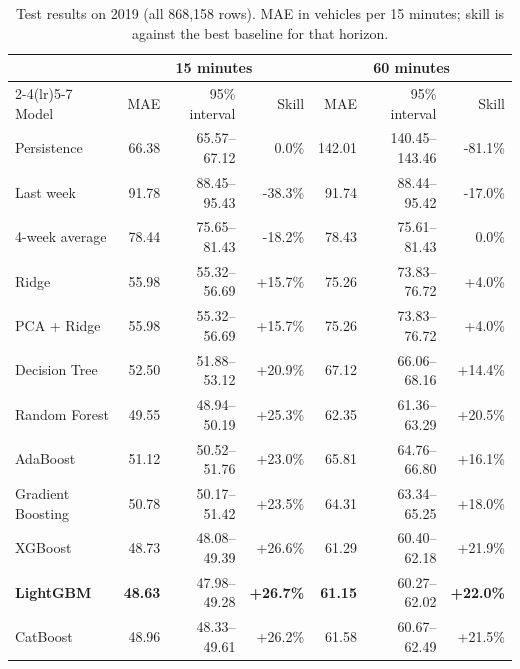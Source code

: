 ﻿\documentclass[11pt,a4paper]{article}
\begin{document}
\begin{table}[H]\centering\small
\begin{tabular}{lrrrrrr}
\toprule & \multicolumn{3}{c}{15 minutes} & \multicolumn{3}{c}{60 minutes} \\
\cmidrule(lr){2-4}\cmidrule(lr){5-7}
Model & MAE & 95\% interval & Skill & MAE & 95\% interval & Skill \\ \midrule
Persistence & 66.38 & 65.57--67.12 & 0.0\% & 142.01 & 140.45--143.46 & -81.1\% \\
Last week & 91.78 & 88.45--95.43 & -38.3\% & 91.74 & 88.44--95.42 & -17.0\% \\
4-week average & 78.44 & 75.65--81.43 & -18.2\% & 78.43 & 75.61--81.43 & 0.0\% \\ \midrule
Ridge & 55.98 & 55.32--56.69 & +15.7\% & 75.26 & 73.83--76.72 & +4.0\% \\
PCA + Ridge & 55.98 & 55.32--56.69 & +15.7\% & 75.26 & 73.83--76.72 & +4.0\% \\
Decision Tree & 52.50 & 51.88--53.12 & +20.9\% & 67.12 & 66.06--68.16 & +14.4\% \\
Random Forest & 49.55 & 48.94--50.19 & +25.3\% & 62.35 & 61.36--63.29 & +20.5\% \\
AdaBoost & 51.12 & 50.52--51.76 & +23.0\% & 65.81 & 64.76--66.80 & +16.1\% \\
Gradient Boosting & 50.78 & 50.17--51.42 & +23.5\% & 64.31 & 63.34--65.25 & +18.0\% \\
XGBoost & 48.73 & 48.08--49.39 & +26.6\% & 61.29 & 60.40--62.18 & +21.9\% \\
\textbf{LightGBM} & \textbf{48.63} & 47.98--49.28 & \textbf{+26.7\%} & \textbf{61.15} & 60.27--62.02 & \textbf{+22.0\%} \\
CatBoost & 48.96 & 48.33--49.61 & +26.2\% & 61.58 & 60.67--62.49 & +21.5\% \\ \bottomrule
\end{tabular}
\caption{Test results on 2019 (all 868,158 rows). MAE in vehicles per 15 minutes; skill is against the best baseline for that horizon.}\label{tab:res}
\end{table}
\end{document}
